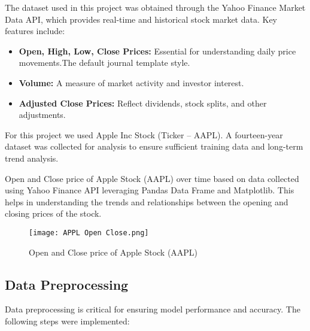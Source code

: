 \documentclass{article}
\begin{document}
The dataset used in this project was obtained through the Yahoo Finance Market Data API, which provides real-time and historical stock market data. Key features include:

\begin{itemize}
\item {{\textbf{Open, High, Low, Close Prices: }}}Essential for understanding daily price movements.The default journal template style.
\item {\textbf{{Volume: }}}A measure of market activity and investor interest.
\item {{\textbf{Adjusted Close Prices: }}}Reflect dividends, stock splits, and other adjustments.
\end{itemize}
For this project we used Apple Inc Stock (Ticker – AAPL). A fourteen-year dataset was collected for analysis to ensure sufficient training data and long-term trend analysis.

Open and Close price of Apple Stock (AAPL) over time based on data collected using Yahoo Finance API leveraging Pandas Data Frame and Matplotlib. This helps in understanding the trends and relationships between the opening and closing prices of the stock.
\newline 
\newline 

\begin{figure}[h]
  \centering
  \texttt{[image: APPL Open Close.png]}
  \caption{ Open and Close price of Apple Stock (AAPL)}
  \Description{}
\end{figure}

\subsection{Data Preprocessing}

Data preprocessing is critical for ensuring model performance and accuracy. The following steps were implemented:
\end{document}
